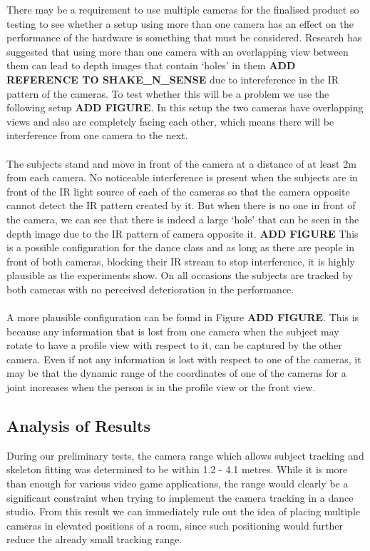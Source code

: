 \documentclass[10pt]{article}
\begin{document}
There may be a requirement to use multiple cameras for the finalised product so testing to see whether a setup using more than one camera has an effect on the performance of the hardware is something that must be considered. Research has suggested that using more than one camera with an overlapping view between them can lead to depth images that contain `holes' in them
\textbf{ADD REFERENCE TO SHAKE\_N\_SENSE} due to intereference in the IR pattern of the cameras. To test whether this will be a problem we use the following setup 
\textbf{ADD FIGURE}. In this setup the two cameras have overlapping views and also are completely facing each other, which means there will be interference from one camera to the next. 
\\\\
\noindent
The subjects stand and move in front of the camera at a distance of at least 2m from each camera. No noticeable interference is present when the subjects are in front of the IR light source of each of the cameras so that the camera opposite cannot detect the IR pattern created by it. But when there is no one in front of the camera, we can see that there is indeed a large `hole' that can be seen in the depth image due to the IR pattern of camera opposite it. 
\textbf{ADD FIGURE}
This is a possible configuration for the dance class and as long as there are people in front of both cameras, blocking their IR stream to stop interference, it is highly plausible as the experiments show. On all occasions the subjects are tracked by both cameras with no perceived deterioration in the performance. 
\\\\
\noindent
A more plausible configuration can be found in Figure \textbf{ADD FIGURE}. This is because any information that is lost from one camera when the subject may rotate to have a profile view with respect to it, can be captured by the other camera. Even if not any information is lost with respect to one of the cameras, it may be that the dynamic range of the coordinates of one of the cameras for a joint increases when the person is in the profile view or the front view. 

\subsection{Analysis of Results}
\noindent
During our preliminary tests, the camera range which allows subject tracking and skeleton fitting was determined to be within 1.2 - 4.1 metres. While it is more than enough for various video game applications, the range would clearly be a significant constraint when trying to implement the camera tracking in a dance studio. From this result we can immediately rule out the idea of placing multiple cameras in elevated positions of a room, since such positioning would further reduce the already small tracking range.
\end{document}
